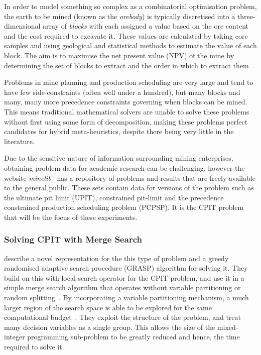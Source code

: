 \documentclass[journal]{IEEEtran}
\begin{document}
In order to model something so complex as a combinatorial optimisation problem, the earth to be mined (known as the \emph{orebody}) is typically discretised into a three-dimensional array of \emph{blocks} with each assigned a value based on the ore content and the cost required to excavate it. These values are calculated by taking core samples and using geological and statistical methods to estimate the value of each block. The aim is to maximise the net present value (NPV) of the mine by determining the set of blocks to extract and the order in which to extract them~\cite{Meagher2014}.\par

Problems in mine planning and production scheduling are very large and tend to have few side-constraints (often well under a hundred), but many blocks and many, many more precedence constraints governing when blocks can be mined. This means traditional mathematical solvers are unable to solve these problems without first using some form of decomposition, making these problems perfect candidates for hybrid meta-heuristics, despite there being very little in the literature.\par

Due to the sensitive nature of information surrounding mining enterprises, obtaining problem data for academic research can be challenging, however the website \emph{minelib}~\cite{espinoza_minelib:_2012} has a repository of problems and results that are freely available to the general public. These sets contain data for versions of the problem such as the ultimate pit limit (UPIT), constrained pit-limit and the precedence constrained production scheduling problem (PCPSP). It is the CPIT problem that will be the focus of these experiments.\par

\subsubsection{Solving CPIT with Merge Search}

\cite{Kenny:2017} describe a novel representation for the this type of problem and a greedy randomised adaptive search procedure (GRASP) algorithm for solving it. They build on this with local search operator for the CPIT problem, and use it in a simple merge search algorithm that operates without variable partitioning or random splitting~\cite{Kenny:2018}. By incorporating a variable partitioning mechanism, a much larger region of the search space is able to be explored for the same computational budget~\cite{Kenny:2019}. They exploit the structure of the problem, and treat many decision variables as a single group. This allows the size of the mixed-integer programming sub-problem to be greatly reduced and hence, the time required to solve it.\par
\end{document}

